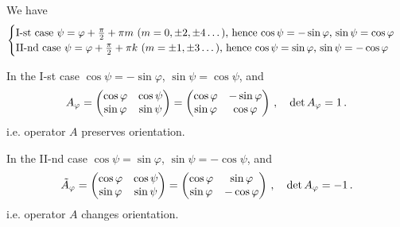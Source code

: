 \documentclass[12pt]{article}
\numberwithin{equation}{section}
\begin{document}
   We have
                  $$
               \begin{cases}
\hbox{I-st case $\psi=\varphi+{\pi\over 2}+\pi m$ ($m=0,\pm 2,\pm 4\dots$),
hence $\cos\psi=-\sin\varphi$,  $\sin\psi=\cos\varphi$}\cr
\hbox {II-nd  case $\psi=\varphi+{\pi\over 2}+\pi k $ ($m=\pm 1,\pm 3\dots$),
hence  $\cos\psi=\sin\varphi$,  $\sin\psi=-\cos\varphi$}\cr
           \end{cases}
                 $$

In the I-st case $\cos\psi=-\sin\varphi$,  $\sin\psi=\cos\psi$, and
           \begin{equation}\label{orthogonalrotation}
  A_\varphi=  
            \begin{pmatrix}
          \cos\varphi  & \cos\psi\cr 
          \sin\varphi & \sin\psi\cr 
              \end{pmatrix}=
            \begin{pmatrix}
          \cos\varphi  & -\sin\varphi\cr 
          \sin\varphi & \cos\varphi\cr 
              \end{pmatrix}\,,\quad
\det A_\varphi=1\,.
           \end{equation}
i.e. operator $A$ preserves orientation.

In the II-nd  case $\cos\psi=\sin\varphi$,  $\sin\psi=-\cos\psi$, and
           \begin{equation}\label{orthogonalrotation+reflection}
  \tilde A_\varphi=  
            \begin{pmatrix}
          \cos\varphi  & \cos\psi\cr 
          \sin\varphi & \sin\psi\cr 
              \end{pmatrix}=
            \begin{pmatrix}
          \cos\varphi  & \sin\varphi\cr 
          \sin\varphi & -\cos\varphi\cr 
              \end{pmatrix}\,,\quad
\det A_\varphi=-1\,.
           \end{equation}
i.e. operator $A$ changes orientation.
\end{document}
